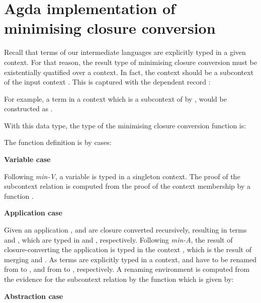 \documentclass[bsc,frontabs,oneside,singlespacing,parskip,deptreport]{infthesis}
\theoremstyle{definition}
\theoremstyle{lemma}
\begin{document}
\section{Agda implementation of minimising closure conversion}
\label{sec:agda-impl-minim}

Recall that terms of our intermediate languages are explicitly typed
in a given context. For that reason, the result type of minimising
closure conversion must be existentially quatified over a
context. In fact, the context should be a subcontext of the input
context . This is captured with the dependent record
:


For example, a term  in a context  which is a subcontext
of  by , would be constructed as .

With this data type, the type of the minimising closure conversion
function is:


The function definition is by cases:

\textbf{Variable case}


Following \textit{min-V}, a variable is typed in a singleton
context. The proof of the subcontext relation is computed from the
proof of the context membership by a function .

\textbf{Application case}


Given an application ,  and  are closure
converted recursively, resulting in terms  and , which
are typed in  and , respectively. Following
\textit{min-A}, the result of closure-converting the application is
typed in the context , which is the result of merging 
and . As terms are explicitly typed in a context,  and
 have to be renamed from  to , and from 
to , respectively. A renaming environment is computed from the
evidence for the subcontext relation by the function  which is
given by:


\textbf{Abstraction case}
\end{document}
